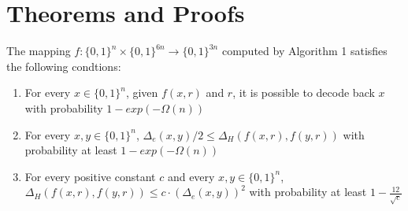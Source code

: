 \documentclass{article}
\begin{document}
\pagebreak
\section*{Theorems and Proofs}
\begin{theorem} 
    The mapping $f:\{0,1\}^n \times \{0,1\}^{6n} \rightarrow \{0,1\}^{3n}$ 
    computed by Algorithm 1 satisfies the following condtions:
    \begin{enumerate}
        \item For every $x \in \{0,1\}^n$, given $f(x,r)$ and $r$, it is possible
        to decode back $x$ with probability $1-exp(-\Omega(n))$
        \item For every $x,y \in \{0,1\}^n$, $\Delta_e(x,y)/2 \leq \Delta_H(f(x,r),f(y,r))$
        with probability at least  $1-exp(-\Omega(n))$
        \item For every positive constant $c$ and every $x,y \in \{0,1\}^n$, 
        $\Delta_H(f(x,r),f(y,r))\leq c \cdot(\Delta_e(x,y))^2$ with probability
        at least $1-\frac{12}{\sqrt{c}}$
    \end{enumerate}
\end{theorem}
\end{document}
